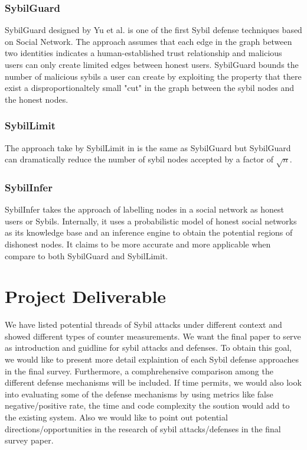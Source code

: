 \documentclass[conference]{IEEEtran}
\begin{document}
\subsubsection{SybilGuard}
SybilGuard designed by Yu et al. \cite{Yu08SybilGuard} is one of the first Sybil defense techniques based on Social Network. The approach assumes that each edge in the graph between two identities indicates a human-established trust relationship and malicious users can only create limited edges between honest users. SybilGuard bounds the number of malicious sybils a user can create by exploiting the property that there exist a disproportionaltely small "cut" in the 
graph between the sybil nodes and the honest nodes.

\subsubsection{SybilLimit}
The approach take by SybilLimit in \cite{Yu08SybilLimit} is the same as SybilGuard but SybilGuard can dramatically reduce the number of sybil nodes accepted by a factor of  $ \sqrt{n} $.

\subsubsection{SybilInfer}
SybilInfer takes the approach of labelling nodes in a social network as honest users or Sybils. Internally, it uses a probabilistic model of honest social networks as its knowledge base and an inference engine to obtain the potential regions of dishonest nodes.
It claims to be more accurate and more applicable when compare to both SybilGuard and SybilLimit.


\section{Project Deliverable}
We have listed potential threads of Sybil attacks under different context and showed different types of counter measurements. 
We want the final paper to serve as introduction and guidline for sybil attacks and defenses.
To obtain this goal, we would like to present more detail explaintion of each Sybil defense approaches in the final survey. Furthermore, a comphrehensive comparison among the different defense mechanisms will be included.
If time permits, we would also look into evaluating some of the defense mechanisms by using metrics like false negative/positive rate, the time and code complexity the soution would add to the existing system.
Also we would like to point out potential directions/opportunities in the research of sybil attacks/defenses in the final survey paper.
\end{document}
